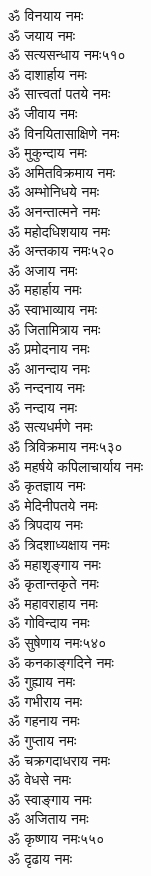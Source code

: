 \begin{center}
\begin{multicols}{2}
\begin{flushleft}
ॐ विनयाय नमः\\
ॐ जयाय नमः\\
ॐ सत्यसन्धाय नमः\hfill ५१०\\
ॐ दाशार्हाय नमः\\
ॐ सात्त्वतां पतये नमः\\
ॐ जीवाय नमः\\
ॐ विनयितासाक्षिणे नमः\\
ॐ मुकुन्दाय नमः\\
ॐ अमितविक्रमाय नमः\\
ॐ अम्भोनिधये नमः\\
ॐ अनन्तात्मने नमः\\
ॐ महोदधिशयाय नमः\\
ॐ अन्तकाय नमः\hfill ५२०\\
ॐ अजाय नमः\\
ॐ महार्हाय नमः\\
ॐ स्वाभाव्याय नमः\\
ॐ जितामित्राय नमः\\
ॐ प्रमोदनाय नमः\\
ॐ आनन्दाय नमः\\
ॐ नन्दनाय नमः\\
ॐ नन्दाय नमः\\
ॐ सत्यधर्मणे नमः\\
ॐ त्रिविक्रमाय नमः\hfill ५३०\\
ॐ महर्षये कपिलाचार्याय नमः\\
ॐ कृतज्ञाय नमः\\
ॐ मेदिनीपतये नमः\\
ॐ त्रिपदाय नमः\\
ॐ त्रिदशाध्यक्षाय नमः\\
ॐ महाशृङ्गाय नमः\\
ॐ कृतान्तकृते नमः\\
ॐ महावराहाय नमः\\
ॐ गोविन्दाय नमः\\
ॐ सुषेणाय नमः\hfill ५४०\\
ॐ कनकाङ्गदिने नमः\\
ॐ गुह्याय नमः\\
ॐ गभीराय नमः\\
ॐ गहनाय नमः\\
ॐ गुप्ताय नमः\\
ॐ चक्रगदाधराय नमः\\
ॐ वेधसे नमः\\
ॐ स्वाङ्गाय नमः\\
ॐ अजिताय नमः\\
ॐ कृष्णाय नमः\hfill ५५०\\
ॐ दृढाय नमः\\

\end{flushleft}
\end{multicols}
\end{center}
